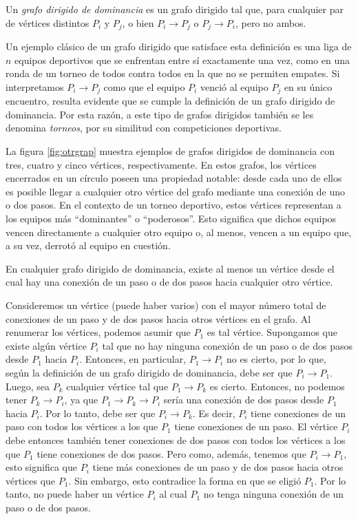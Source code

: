 \begin{definicion}{}{}
    Un \emph{grafo dirigido de dominancia} es un grafo dirigido tal que, para cualquier par de vértices distintos $P_i$ y $P_j$, o bien $P_i \to P_j$ o $P_j \to P_i$, pero no ambos.
\end{definicion}

Un ejemplo clásico de un grafo dirigido que satisface esta definición es una liga de $n$ equipos deportivos que se enfrentan entre sí exactamente una vez, como en una ronda de un torneo de todos contra todos en la que no se permiten empates. Si interpretamos $P_i \to P_j$ como que el equipo $P_i$ venció al equipo $P_j$ en su único encuentro, resulta evidente que se cumple la definición de un grafo dirigido de dominancia. Por esta razón, a este tipo de grafos dirigidos también se les denomina \emph{torneos}, por su similitud con competiciones deportivas.

La figura \ref{fig:otrgrap} muestra ejemplos de grafos dirigidos de dominancia con tres, cuatro y cinco vértices, respectivamente. En estos grafos, los vértices encerrados en un círculo poseen una propiedad notable: desde cada uno de ellos es posible llegar a cualquier otro vértice del grafo mediante una conexión de uno o dos pasos. En el contexto de un torneo deportivo, estos vértices representan a los equipos más “dominantes” o “poderosos”. Esto significa que dichos equipos vencen directamente a cualquier otro equipo o, al menos, vencen a un equipo que, a su vez, derrotó al equipo en cuestión.

\newpage

\begin{theorem}{}{}
    En cualquier grafo dirigido de dominancia, existe al menos un vértice desde el cual hay una conexión de un paso o de dos pasos hacia cualquier otro vértice.

    \tcblower
    \demostracion Consideremos un vértice (puede haber varios) con el mayor número total de conexiones de un paso y de dos pasos hacia otros vértices en el grafo. Al renumerar los vértices, podemos asumir que $P_1$ es tal vértice. Supongamos que existe algún vértice $P_i$ tal que no hay ninguna conexión de un paso o de dos pasos desde $P_1$ hacia $P_i$. Entonces, en particular, $P_1 \to P_i$ no es cierto, por lo que, según la definición de un grafo dirigido de dominancia, debe ser que $P_i \to P_1$. Luego, sea $P_k$ cualquier vértice tal que $P_1 \to P_k$ es cierto. Entonces, no podemos tener $P_k \to P_i$, ya que $P_1 \to P_k \to P_i$ sería una conexión de dos pasos desde $P_1$ hacia $P_i$. Por lo tanto, debe ser que $P_i \to P_k$. Es decir, $P_i$ tiene conexiones de un paso con todos los vértices a los que $P_1$ tiene conexiones de un paso. El vértice $P_i$ debe entonces también tener conexiones de dos pasos con todos los vértices a los que $P_1$ tiene conexiones de dos pasos. Pero como, además, tenemos que $P_i \to P_1$, esto significa que $P_i$ tiene más conexiones de un paso y de dos pasos hacia otros vértices que $P_1$. Sin embargo, esto contradice la forma en que se eligió $P_1$. Por lo tanto, no puede haber un vértice $P_i$ al cual $P_1$ no tenga ninguna conexión de un paso o de dos pasos.
\end{theorem}

